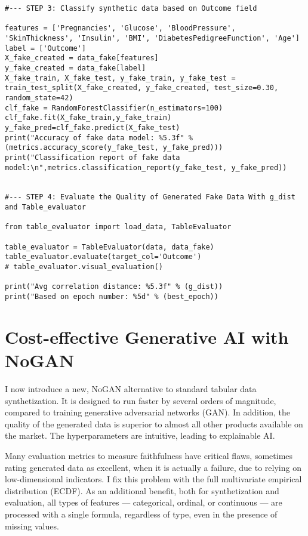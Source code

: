 \documentclass[oneside,10pt]{book}
\begin{document}
\begin{lstlisting}
#--- STEP 3: Classify synthetic data based on Outcome field

features = ['Pregnancies', 'Glucose', 'BloodPressure', 'SkinThickness', 'Insulin', 'BMI', 'DiabetesPedigreeFunction', 'Age']
label = ['Outcome']
X_fake_created = data_fake[features]
y_fake_created = data_fake[label]
X_fake_train, X_fake_test, y_fake_train, y_fake_test = train_test_split(X_fake_created, y_fake_created, test_size=0.30, random_state=42)
clf_fake = RandomForestClassifier(n_estimators=100)
clf_fake.fit(X_fake_train,y_fake_train)
y_fake_pred=clf_fake.predict(X_fake_test)
print("Accuracy of fake data model: %5.3f" % (metrics.accuracy_score(y_fake_test, y_fake_pred)))
print("Classification report of fake data model:\n",metrics.classification_report(y_fake_test, y_fake_pred))


#--- STEP 4: Evaluate the Quality of Generated Fake Data With g_dist and Table_evaluator

from table_evaluator import load_data, TableEvaluator

table_evaluator = TableEvaluator(data, data_fake)
table_evaluator.evaluate(target_col='Outcome')
# table_evaluator.visual_evaluation() 

print("Avg correlation distance: %5.3f" % (g_dist))
print("Based on epoch number: %5d" % (best_epoch))
\end{lstlisting}


\chapter{Cost-effective Generative AI with NoGAN}\label{chnogan}

I now introduce a new, NoGAN alternative to standard tabular data synthetization. It is designed to run faster by several orders of magnitude, compared to training generative adversarial networks (GAN). In addition, the quality of the generated data is superior to almost all other products available on the market. The hyperparameters are intuitive, leading to explainable AI.

Many evaluation metrics to measure faithfulness have critical flaws, sometimes rating generated data as excellent, when it is actually a failure, due to relying on low-dimensional indicators. I fix this problem with the full multivariate empirical distribution (ECDF). As an additional benefit, both for synthetization and evaluation, all types of features — categorical, ordinal, or continuous — are processed with a single formula, regardless of type, even in the presence of missing values.
\end{document}
